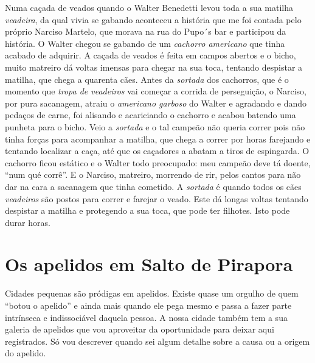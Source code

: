 \documentclass[12pt,brazil,]{book}
\begin{document}
Numa caçada de veados quando o Walter Benedetti levou toda a sua matilha
\emph{veadeira}, da qual vivia se gabando aconteceu a história que me
foi contada pelo próprio Narciso Martelo, que morava na rua do Pupo´s
bar e participou da história. O Walter chegou se gabando de um
\emph{cachorro americano} que tinha acabado de adquirir. A caçada de
veados é feita em campos abertos e o bicho, muito matreiro dá voltas
imensas para chegar na sua toca, tentando despistar a matilha, que chega
a quarenta cães. Antes da \emph{sortada} dos cachorros, que é o momento
que \emph{tropa de veadeiros} vai começar a corrida de perseguição, o
Narciso, por pura sacanagem, atraiu o \emph{americano garboso} do Walter
e agradando e dando pedaços de carne, foi alisando e acariciando o
cachorro e acabou batendo uma punheta para o bicho. Veio a
\emph{sortada} e o tal campeão não queria correr pois não tinha forças
para acompanhar a matilha, que chega a correr por horas farejando e
tentando localizar a caça, até que os caçadores a abatam a tiros de
espingarda. O cachorro ficou estático e o Walter todo preocupado: meu
campeão deve tá doente, ``num qué corrê''. E o Narciso, matreiro,
morrendo de rir, pelos cantos para não dar na cara a sacanagem que tinha
cometido. A \emph{sortada} é quando todos os cães \emph{veadeiros} são
postos para correr e farejar o veado. Este dá longas voltas tentando
despistar a matilha e protegendo a sua toca, que pode ter filhotes. Isto
pode durar horas.

\section{Os apelidos em Salto de
Pirapora}\label{os-apelidos-em-salto-de-pirapora}

Cidades pequenas são pródigas em apelidos. Existe quase um orgulho de
quem ``botou o apelido'' e ainda mais quando ele pega mesmo e passa a
fazer parte intrínseca e indissociável daquela pessoa. A nossa cidade
também tem a sua galeria de apelidos que vou aproveitar da oportunidade
para deixar aqui registrados. Só vou descrever quando sei algum detalhe
sobre a causa ou a origem do apelido.
\end{document}
